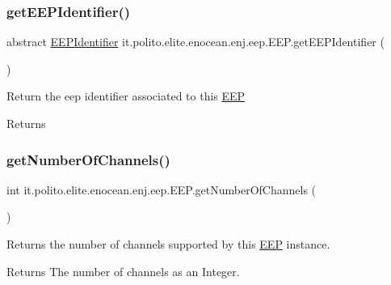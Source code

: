 \subsubsection{\texorpdfstring{get\+E\+E\+P\+Identifier()}{getEEPIdentifier()}}
{\footnotesize\ttfamily abstract \hyperlink{classit_1_1polito_1_1elite_1_1enocean_1_1enj_1_1eep_1_1_e_e_p_identifier}{E\+E\+P\+Identifier} it.\+polito.\+elite.\+enocean.\+enj.\+eep.\+E\+E\+P.\+get\+E\+E\+P\+Identifier (\begin{DoxyParamCaption}{ }\end{DoxyParamCaption})\hspace{0.3cm}{\ttfamily [abstract]}}

Return the eep identifier associated to this \hyperlink{classit_1_1polito_1_1elite_1_1enocean_1_1enj_1_1eep_1_1_e_e_p}{E\+EP}

\begin{DoxyReturn}{Returns}

\end{DoxyReturn}
\hypertarget{classit_1_1polito_1_1elite_1_1enocean_1_1enj_1_1eep_1_1_e_e_p_a03ccc395ee002e8530bc46c7821160a2}{}\label{classit_1_1polito_1_1elite_1_1enocean_1_1enj_1_1eep_1_1_e_e_p_a03ccc395ee002e8530bc46c7821160a2} 
\subsubsection{\texorpdfstring{get\+Number\+Of\+Channels()}{getNumberOfChannels()}}
{\footnotesize\ttfamily int it.\+polito.\+elite.\+enocean.\+enj.\+eep.\+E\+E\+P.\+get\+Number\+Of\+Channels (\begin{DoxyParamCaption}{ }\end{DoxyParamCaption})}

Returns the number of channels supported by this \hyperlink{classit_1_1polito_1_1elite_1_1enocean_1_1enj_1_1eep_1_1_e_e_p}{E\+EP} instance.

\begin{DoxyReturn}{Returns}
The number of channels as an Integer. 
\end{DoxyReturn}
\hypertarget{classit_1_1polito_1_1elite_1_1enocean_1_1enj_1_1eep_1_1_e_e_p_a02994c59d05bad9cd22418105ee6073c}{}\label{classit_1_1polito_1_1elite_1_1enocean_1_1enj_1_1eep_1_1_e_e_p_a02994c59d05bad9cd22418105ee6073c} 
